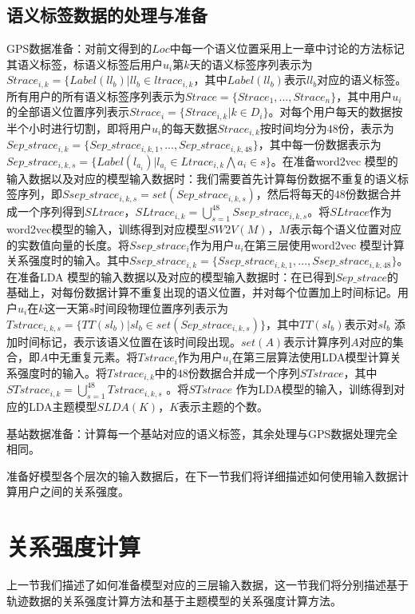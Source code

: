 \subsection{语义标签数据的处理与准备}
GPS数据准备：对前文得到的$Loc$中每一个语义位置采用上一章中讨论的方法标记其语义标签，标语义标签后用户$u_{i}$第$k$天的语义标签序列表示为$Strace_{i,k}=\{Label(ll_{b})|ll_{b}\in ltrace_{i,k}$，其中$Label(ll_{b})$表示$ll_{b}$对应的语义标签。所有用户的所有语义标签序列表示为$Strace=\{Strace_{1},...,Strace_{n}\}$，其中用户$u_{i}$的全部语义位置序列表示$Strace_{i}=\{Strace_{i,k}|k\in D_{i}\}$。对每个用户每天的数据按半个小时进行切割，即将用户$u_{i}$的每天数据$Strace_{i,k}$按时间均分为$48$份，表示为$Sep\_strace_{i,k}=\{Sep\_strace_{i,k,1},...,Sep\_strace_{i,k,48}\}$，其中每一份数据表示为$Sep\_strace_{i,k,s}=\{Label(l_{a_{i}})|l_{a_{i}}\in Ltrace_{i,k} \bigwedge a_{i}\in s\}$。在准备word2vec 模型的输入数据以及对应的模型输入数据时：我们需要首先计算每份数据不重复的语义标签序列，即$Ssep\_strace_{i,k,s}=set(Sep\_strace_{i,k,s})$，然后将每天的$48$份数据合并成一个序列得到$SLtrace$，$SLtrace_{i,k}=\bigcup_{s=1}^{48}Ssep\_strace_{i,k,s}$。将$SLtrace$作为word2vec模型的输入，训练得到对应模型$SW2V(M)$，$M$表示每个语义位置对应的实数值向量的长度。将$Ssep\_strace_{i}$作为用户$u_{i}$在第三层使用word2vec 模型计算关系强度时的输入。其中$Ssep\_strace_{i,k}=\{Ssep\_strace_{i,k,1},...,Ssep\_strace_{i,k,48}\}$。在准备LDA 模型的输入数据以及对应的模型输入数据时：在已得到$Sep\_strace$的基础上，对每份数据计算不重复出现的语义位置，并对每个位置加上时间标记。用户$u_{i}$在$k$这一天第$s$时间段物理位置序列表示为$Tstrace_{i,k,s}=\{TT(sl_{b})|sl_{b}\in set(Sep\_strace_{i,k,s})\}$，其中$TT(sl_{b})$表示对$sl_{b}$ 添加时间标记，表示该语义位置在该时间段出现。$set(A)$表示计算序列$A$对应的集合，即$A$中无重复元素。将$Tstrace_{i}$作为用户$u_{i}$在第三层算法使用LDA模型计算关系强度时的输入。将$Tstrace_{i,k}$中的$48$份数据合并成一个序列$STstrace$，其中$STstrace_{i,k}=\bigcup_{s=1}^{48}Tstrace_{i,k,s}$ 。将$STstrace$ 作为LDA模型的输入，训练得到对应的LDA主题模型$SLDA(K)$，$K$表示主题的个数。
\par 基站数据准备：计算每一个基站对应的语义标签，其余处理与GPS数据处理完全相同。
\par 准备好模型各个层次的输入数据后，在下一节我们将详细描述如何使用输入数据计算用户之间的关系强度。
\section{关系强度计算}
\label{sec:section4-3}
上一节我们描述了如何准备模型对应的三层输入数据，这一节我们将分别描述基于轨迹数据的关系强度计算方法和基于主题模型的关系强度计算方法。
